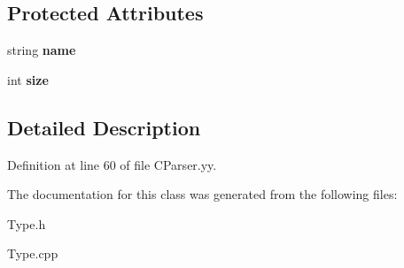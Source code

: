 \subsection*{Protected Attributes}
\begin{DoxyCompactItemize}
\item 
\hypertarget{classType_ad7eeefba3dfcecbdaa98d46aaa84e389}{string {\bfseries name}}\label{classType_ad7eeefba3dfcecbdaa98d46aaa84e389}

\item 
\hypertarget{classType_a871302dc63ac1a37c0b6a225cf82048d}{int {\bfseries size}}\label{classType_a871302dc63ac1a37c0b6a225cf82048d}

\end{DoxyCompactItemize}


\subsection{Detailed Description}


Definition at line 60 of file C\-Parser.\-yy.



The documentation for this class was generated from the following files\-:\begin{DoxyCompactItemize}
\item 
Type.\-h\item 
Type.\-cpp\end{DoxyCompactItemize}
